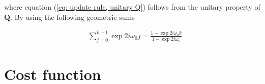 \documentclass[11pt,a4paper,twoside]{report}
\newcommand{\mat}[1]{\mathbf{#1}}
\begin{document}
where equation (\ref{eq: update rule, unitary Q}) follows from the unitary property of $\mat{Q}$. By using the following geometric sums

\begin{align}
	& \sum_{j=0}^{k-1}\exp{2i\omega_0j} = \frac{1-\exp{2i\omega_0k}}{1-\exp{2i\omega_0}}
\end{align}



\chapter*{Cost function}
\cite{SIP}
\clearpage

%

\end{document}
